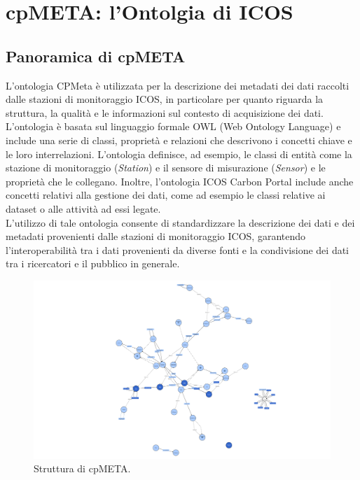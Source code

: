 \chapter{cpMETA: l'Ontolgia di ICOS}
\label{chap:cpMETA}

\section{Panoramica di cpMETA}
\label{section:panoramica}
L'ontologia CPMeta è utilizzata per
la descrizione dei metadati dei dati raccolti
dalle stazioni di monitoraggio ICOS, in particolare
per quanto riguarda la struttura, la qualità e le
informazioni sul contesto di acquisizione dei dati.\\

L'ontologia è basata sul linguaggio formale OWL
(Web Ontology Language) e include una serie di classi,
proprietà e relazioni che descrivono i concetti chiave
e le loro interrelazioni. L'ontologia definisce,
ad esempio, le classi di entità come
la stazione di monitoraggio (\textit{Station}) e
il sensore di misurazione (\textit{Sensor}) e le
proprietà che le collegano. Inoltre, l'ontologia ICOS
Carbon Portal include
anche concetti relativi alla gestione dei dati,
come ad esempio le classi relative ai dataset o alle attività
ad essi legate.\\

L'utilizzo di tale ontologia
consente di standardizzare la descrizione dei
dati e dei metadati provenienti dalle stazioni di
monitoraggio ICOS, garantendo l'interoperabilità tra
i dati provenienti da diverse fonti e la condivisione
dei dati tra i ricercatori e il pubblico in generale.\\

\begin{figure}[h!]
    \centering
    \includegraphics[height=0.6\textwidth]{figures/instanceschema.rdf-_1_.jpg}
    \caption{Struttura di cpMETA.}
    \label{figure:cpmetastructure}
\end{figure}

